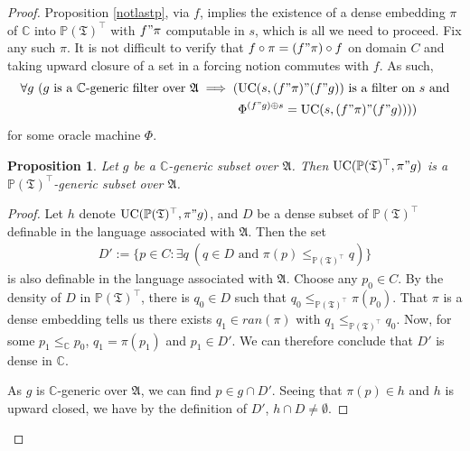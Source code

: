 \documentclass[12pt, twoside]{memoir}
\numberwithin{equation}{section}
\newtheorem{prop}[thm]{Proposition}
\theoremstyle{definition}
\theoremstyle{remark}
\theoremstyle{definition}
\theoremstyle{definition}
\theoremstyle{definition}
\theoremstyle{remark}
\begin{document}
\begin{proof}
Proposition \ref{notlastp}, via $f$, implies the existence of a dense embedding $\pi$ of $\mathbb{C}$ into $\mathbb{P}(\mathfrak{T})^{\top}$ with $f" \pi$ computable in $s$, which is all we need to proceed. Fix any such $\pi$. It is not difficult to verify that $f \circ \pi = (f" \pi) \circ f$ on domain $C$ and taking upward closure of a set in a forcing notion commutes with $f$. As such, 
\begin{align}\label{number8}
\begin{split}
    \forall g \ (g \text{ is a } \mathbb{C} \text{-generic filter over } \mathfrak{A} \implies ( & \mathrm{UC}(s, (f" \pi)" (f" g)) \text{ is a filter on } s \text{ and} \\
    & \Phi^{(f" g) \oplus s} = \mathrm{UC}(s, (f" \pi)" (f" g))))
\end{split}
\end{align}
for some oracle machine $\Phi$.

\begin{prop}\label{lastprop0}
Let $g$ be a $\mathbb{C}$-generic subset over $\mathfrak{A}$. Then $\mathrm{UC}(\mathbb{P}(\mathfrak{T})^{\top}, \pi" g)$ is a $\mathbb{P}(\mathfrak{T})^{\top}$-generic subset over $\mathfrak{A}$.
\end{prop}

\begin{proof}
Let $h$ denote $\mathrm{UC}(\mathbb{P}(\mathfrak{T})^{\top}, \pi" g)$, and $D$ be a dense subset of $\mathbb{P}(\mathfrak{T})^{\top}$ definable in the language associated with $\mathfrak{A}$. Then the set
\begin{align*}
    D' := \{p \in C : \exists q \ (q \in D \text{ and } \pi(p) \leq_{\mathbb{P}(\mathfrak{T})^{\top}} q)\}
\end{align*}
is also definable in the language associated with $\mathfrak{A}$. Choose any $p_0 \in C$. By the density of $D$ in $\mathbb{P}(\mathfrak{T})^{\top}$, there is $q_0 \in D$ such that $q_0 \leq_{\mathbb{P}(\mathfrak{T})^{\top}} \pi(p_0)$. That $\pi$ is a dense embedding tells us there exists $q_1 \in ran(\pi)$ with $q_1 \leq_{\mathbb{P}(\mathfrak{T})^{\top}} q_0$. Now, for some $p_1 \leq_{\mathbb{C}} p_0$, $q_1 = \pi(p_1)$ and $p_1 \in D'$. We can therefore conclude that $D'$ is dense in $\mathbb{C}$.

As $g$ is $\mathbb{C}$-generic over $\mathfrak{A}$, we can find $p \in g \cap D'$. Seeing that $\pi(p) \in h$ and $h$ is upward closed, we have by the definition of $D'$, $h \cap D \neq \emptyset$.
\end{proof}


\end{proof}
\end{document}
